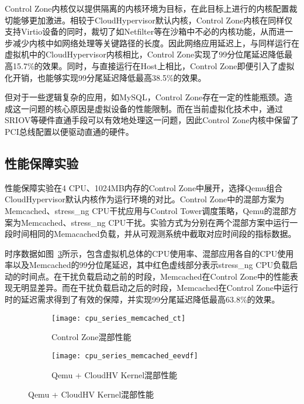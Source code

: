 Control Zone内核仅以提供隔离的内核环境为目标，在此目标上进行的内核配置裁切能够更加激进。相较于CloudHypervisor默认内核，Control Zone内核在同样仅支持Virtio设备的同时，裁切了如Netfilter等在沙箱中不必的内核功能，从而进一步减少内核中如网络处理等关键路径的长度。因此网络应用延迟上，与同样运行在虚拟机中的CloudHypervisor内核相比，Control Zone实现了99分位尾延迟降低最高15.7\%的效果。同时，与直接运行在Host上相比，Control Zone即便引入了虚拟化开销，也能够实现99分尾延迟降低最高38.5\%的效果。

但对于一些逻辑复杂的应用，如MySQL，Control Zone存在一定的性能瓶颈。造成这一问题的核心原因是虚拟设备的性能限制。而在当前虚拟化技术中，通过SRIOV等硬件直通手段可以有效地处理这一问题，因此Control Zone内核中保留了PCI总线配置以便驱动直通的硬件。

\subsection{性能保障实验}

性能保障实验在4 CPU、1024MB内存的Control Zone中展开，选择Qemu组合CloudHypervisor默认内核作为运行环境的对比。Control Zone中的混部方案为Memcached、stress\_ng CPU干扰应用与Control Tower调度策略，Qemu的混部方案为Memcached、stress\_ng CPU干扰。实验方式为分别在两个混部方案中运行一段时间相同的Memacached负载，并从可观测系统中截取对应时间段的指标数据。

时序数据如图~\ref{fig:cpu_series_memcached}所示，包含虚拟机总体的CPU使用率、混部应用各自的CPU使用率以及Memcached的99分位尾延迟，其中红色虚线部分表示stress\_ng CPU负载启动的时间点。在干扰负载启动之前的时段，Memcached在Control Zone中的性能表现无明显差异。而在干扰负载启动之后的时段，Memcached在Control Zone中运行时的延迟需求得到了有效的保障，并实现99分尾延迟降低最高63.8\%的效果。

\begin{figure}[H]
    \centering
    \begin{subfigure}[b]{0.49\textwidth}
        \texttt{[image: cpu\_series\_memcached\_ct]}
        \caption{\quad Control Zone混部性能}
        \label{fig:cpu_series_memcached_ct}
    \end{subfigure}
    \begin{subfigure}[b]{0.49\textwidth}
        \texttt{[image: cpu\_series\_memcached\_eevdf]}
        \caption{\quad Qemu + CloudHV Kernel混部性能}
        \label{fig:cpu_series_memcached_eevdf}
    \end{subfigure}
    \label{fig:cpu_series_memcached}
\end{figure}

